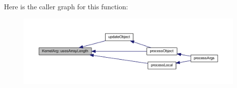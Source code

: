Here is the caller graph for this function\-:
\nopagebreak
\begin{figure}[H]
\begin{center}
\leavevmode
\includegraphics[width=350pt]{class_kernel_arg_a4c7a7abe38cc18d254136b89ee817306_icgraph}
\end{center}
\end{figure}




